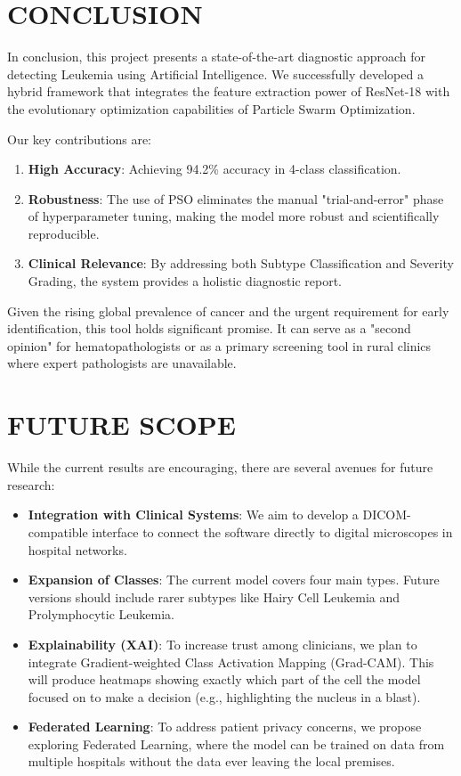 \documentclass[twocolumn,10pt,a4paper]{article}
\begin{document}
\section{CONCLUSION}
In conclusion, this project presents a state-of-the-art diagnostic approach for detecting Leukemia using Artificial Intelligence. We successfully developed a hybrid framework that integrates the feature extraction power of ResNet-18 with the evolutionary optimization capabilities of Particle Swarm Optimization.

Our key contributions are:
\begin{enumerate}
    \item \textbf{High Accuracy}: Achieving 94.2\% accuracy in 4-class classification.
    \item \textbf{Robustness}: The use of PSO eliminates the manual "trial-and-error" phase of hyperparameter tuning, making the model more robust and scientifically reproducible.
    \item \textbf{Clinical Relevance}: By addressing both Subtype Classification and Severity Grading, the system provides a holistic diagnostic report.
\end{enumerate}

Given the rising global prevalence of cancer and the urgent requirement for early identification, this tool holds significant promise. It can serve as a "second opinion" for hematopathologists or as a primary screening tool in rural clinics where expert pathologists are unavailable.

\section{FUTURE SCOPE}
While the current results are encouraging, there are several avenues for future research:
\begin{itemize}
    \item \textbf{Integration with Clinical Systems}: We aim to develop a DICOM-compatible interface to connect the software directly to digital microscopes in hospital networks.
    \item \textbf{Expansion of Classes}: The current model covers four main types. Future versions should include rarer subtypes like Hairy Cell Leukemia and Prolymphocytic Leukemia.
    \item \textbf{Explainability (XAI)}: To increase trust among clinicians, we plan to integrate Gradient-weighted Class Activation Mapping (Grad-CAM). This will produce heatmaps showing exactly which part of the cell the model focused on to make a decision (e.g., highlighting the nucleus in a blast).
    \item \textbf{Federated Learning}: To address patient privacy concerns, we propose exploring Federated Learning, where the model can be trained on data from multiple hospitals without the data ever leaving the local premises.
\end{itemize}
\end{document}
